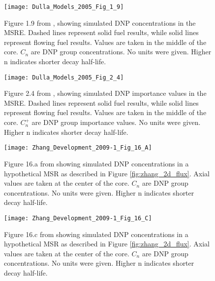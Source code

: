 \documentclass[review]{elsarticle}
\begin{document}
\begin{figure}[H]
   \centering
   \texttt{[image: Dulla\_Models\_2005\_Fig\_1\_9]}
   \caption{Figure 1.9 from \cite{dulla_models_2005}, 
    showing simulated DNP concentrations in the
    MSRE. Dashed lines represent
    solid fuel results, while solid lines represent flowing fuel results. Values
    are taken in the middle of the core. $C_{n}$ are DNP group concentrations. No
    units were given. Higher n indicates shorter decay half-life.}
   \label{fig:dulla_msre_dnp_displacement}
\end{figure}

\begin{figure}[H]
   \centering
   \texttt{[image: Dulla\_Models\_2005\_Fig\_2\_4]}
   \caption{Figure 2.4 from \cite{dulla_models_2005}, showing simulated DNP
    importance values in the
    MSRE. Dashed lines represent
    solid fuel results, while solid lines represent flowing fuel results. Values
    are taken in the middle of the core. $C_{n}^{+}$ are DNP group importance values. 
    No units were given. Higher n indicates shorter decay half-life.}
   \label{fig:dulla_msre_dnp_importance}
\end{figure}

\begin{figure}[H]
   \centering
   \texttt{[image: Zhang\_Development\_2009-1\_Fig\_16\_A]}
   \caption{Figure 16.a from \cite{zhang_development_2009-1} showing simulated
                DNP concentrations
               in a hypothetical MSR as described in Figure \ref{fig:zhang_2d_flux}.
               Axial
               values are taken at the center of the core. $C_{n}$ are DNP
               group concentrations. No units were given. Higher n indicates
               shorter decay half-life.}
   \label{fig:zhang_axial_velocity_dnp_1}
\end{figure}

\begin{figure}[H]
   \centering
   \texttt{[image: Zhang\_Development\_2009-1\_Fig\_16\_C]}
   \caption{Figure 16.c from \cite{zhang_development_2009-1} showing simulated DNP concentrations
               in a hypothetical MSR as described in Figure \ref{fig:zhang_2d_flux}.
               Axial
               values are taken at the center of the core. $C_{n}$ are DNP
               group concentrations. No units were given. Higher n indicates
               shorter decay half-life.}
   \label{fig:zhang_axial_velocity_dnp_2}
\end{figure}
\end{document}
